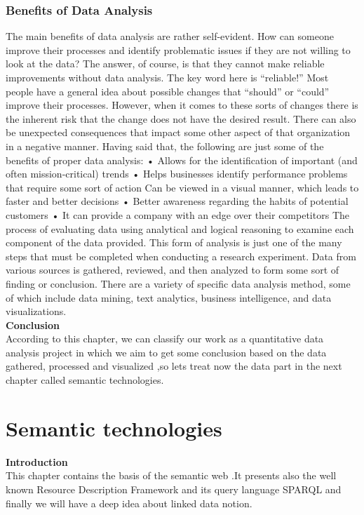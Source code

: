 \documentclass[a4paper,12pt,oneside]{report}
\begin{document}
{\subsection{Benefits of Data Analysis}
{The main benefits of data analysis are rather self-evident. How can someone improve their processes and identify problematic issues if they are not willing to look at the data? The answer, of course, is that they cannot make reliable improvements without data analysis. The key word here is “reliable!” Most people have a general idea about possible changes that “should” or “could” improve their processes. However, when it comes to these sorts of changes there is the inherent risk that the change does not have the desired result. There can also be unexpected consequences that impact some other aspect of that organization in a negative manner. Having said that, the following are just some of the benefits of proper data analysis:
•	Allows for the identification of important (and often mission-critical) trends
•	Helps businesses identify performance problems that require some sort of action Can be viewed in a visual manner, which leads to faster and better decisions
•	Better awareness regarding the habits of potential customers
•	It can provide a company with an edge over their competitors
The process of evaluating data using analytical and logical reasoning to examine each component of the data provided. This form of analysis is just one of the many steps that must be completed when conducting a research experiment. Data from various sources is gathered, reviewed, and then analyzed to form some sort of finding or conclusion. There are a variety of specific data analysis method, some of which include data mining, text analytics, business intelligence, and data visualizations.}\\

\textbf{Conclusion}\\
{According to this chapter, we can classify our work as a quantitative data analysis project in which we aim to get some conclusion based on the data gathered, processed and visualized ,so lets treat now the data part in the next chapter called semantic technologies.}
\chapter{Semantic technologies}
\textbf{Introduction}\\
{This chapter contains the basis of the semantic web .It presents also the well known Resource Description Framework and its query language SPARQL and finally we will have a deep idea about linked data notion.}
}
\end{document}
